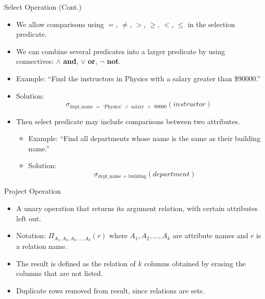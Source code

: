 \documentclass{beamer}
\begin{document}
\begin{frame}{Select Operation (Cont.)}
    \begin{itemize}
        \item We allow comparisons using $=$, $\neq$, $>$, $\geq$, $<$, $\leq$ in the selection predicate.
        \item We can combine several predicates into a larger predicate by using connectives: $\wedge$ \textbf{and}, $\vee$ \textbf{or}, $\neg$ \textbf{not}. 
        \item Example: ``Find the instructors in Physics with a salary greater than \$90000.''
        \item Solution: $$
            \sigma_{\text{dept\_name }=\text{ `Physics' } \wedge \text{ salary } > \text{ 90000}}(instructor)
        $$
        \item Then select predicate may include comparisons between two attributes.
        \begin{itemize}
            \item Example: ``Find all departments whose name is the same as their building name.''
            \item Solution: $$
                \sigma_{\text{dept\_name } = \text{ building}}(department)
            $$
        \end{itemize}
    \end{itemize}
\end{frame}

\begin{frame}{Project Operation}
    \begin{itemize}
        \item A unary operation that returns its argument relation, with certain attributes left out.
        \item Notation: { \LARGE $\Pi_{A_1, A_2, A_3, \ldots, A_k} (r)$ } where $A_1, A_2, \ldots, A_k$ are attribute names and $r$ is a relation name.
        \item The result is defined as the relation of $k$ columns obtained by erasing the columns that are not listed.
        \item Duplicate rows removed from result, since relations are sets.
    \end{itemize}
\end{frame}
\end{document}
